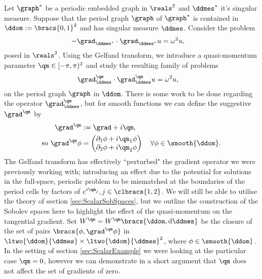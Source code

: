 Let $\graph^*$ be a periodic embedded graph in $\reals^2$ and $\ddmes^*$ it's singular measure.
Suppose that the period graph $\graph$ of $\graph^*$ is contained in $\ddom:=\bracs{0,1}^2$ and has singular measure $\ddmes$.
Consider the problem
\begin{align} \label{eq:WholeSpaceScalarProblem}
	-\grad_{\ddmes^*} \cdot \grad_{\ddmes^*} u &= \omega^2 u,
\end{align}
posed in $\reals^2$.
Using the Gelfand transform, we introduce a quasi-momentum parameter $\qm\in[-\pi,\pi)^2$ and study the resulting family of problems
\begin{align*}
	\grad_\ddmes^\qm \cdot \grad_\ddmes^\qm u &= \omega^2 u,
\end{align*}
on the period graph $\graph$ in $\ddom$.
There is some work to be done regarding the operator $\grad_\ddmes^\qm$, but for smooth functions we can define the suggestive $\grad^\qm$ by
\begin{align*}
	\grad^\qm &:= \grad + i\qm, \\
	\text{so } \grad^\qm \phi &= \begin{pmatrix} \partial_1\phi + i\qm_1\phi \\ \partial_2\phi + i\qm_2\phi \end{pmatrix} \quad \forall\phi\in\smooth{\ddom}.
\end{align*}
The Gelfand transform has effectively ``perturbed" the gradient operator we were previously working with; introducing an effect due to the potential for solutions in the full-space, periodic problem to be mismatched at the boundaries of the period cells by factors of $e^{i\qm_j}, j\in\clbracs{1,2}$.
We will still be able to utilise the theory of section \ref{sec:ScalarSobSpaces}, but we outline the construction of the Sobolev spaces here to highlight the effect of the quasi-momentum on the tangential gradient.
Set $W^\qm=W^\qm\bracs{\ddom,\mathrm{d}\ddmes}$ be the closure of the set of pairs $\bracs{\phi,\grad^\qm\phi}$ in $\ltwo{\ddom}{\ddmes}\times\ltwo{\ddom}{\ddmes}^2$, where $\phi\in\smooth{\ddom}$.
In the setting of section \ref{sec:ScalarExample} we were looking at the particular case $\qm=0$, however we can demonstrate in a short argument that $\qm$ does not affect the set of gradients of zero.

